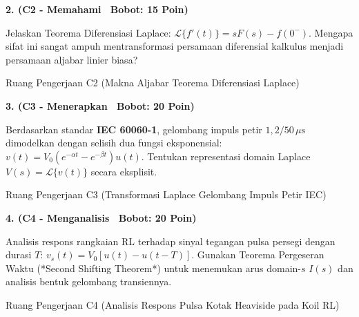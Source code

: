 \documentclass[10pt,a4paper]{article}
\begin{document}
\vspace{1mm}

\noindent\textbf{2. (C2 - Memahami \textbar\ Bobot: 15 Poin)}\par\vspace{0.5mm}
{\footnotesize Jelaskan Teorema Diferensiasi Laplace: $\mathcal{L}\{f'(t)\} = s F(s) - f(0^-)$. Mengapa sifat ini sangat ampuh mentransformasi persamaan diferensial kalkulus menjadi persamaan aljabar linier biasa?}
\begin{answerbox}{Ruang Pengerjaan C2 (Makna Aljabar Teorema Diferensiasi Laplace)}
  \vspace{2.1cm}
\end{answerbox}

\vspace{1mm}

\noindent\textbf{3. (C3 - Menerapkan \textbar\ Bobot: 20 Poin)}\par\vspace{0.5mm}
\noindent\begin{minipage}[t]{0.60\textwidth}%
  {\footnotesize Berdasarkan standar \textbf{IEC 60060-1}, gelombang impuls petir $1{,}2/50\,\mu\text{s}$ dimodelkan dengan selisih dua fungsi eksponensial: $v(t) = V_0 (e^{-\alpha t} - e^{-\beta t}) u(t)$. Tentukan representasi domain Laplace $V(s) = \mathcal{L}\{v(t)\}$ secara eksplisit.}%
\end{minipage}%
\hfill%
\begin{minipage}[t]{0.37\textwidth}%
  \centering
\end{minipage}\par\vspace{1mm}
\begin{answerbox}{Ruang Pengerjaan C3 (Transformasi Laplace Gelombang Impuls Petir IEC)}
  \vspace{2.8cm}
\end{answerbox}

\newpage

\noindent\textbf{4. (C4 - Menganalisis \textbar\ Bobot: 20 Poin)}\par\vspace{0.5mm}
{\footnotesize Analisis respons rangkaian RL terhadap sinyal tegangan pulsa persegi dengan durasi $T$: $v_s(t) = V_0 [u(t) - u(t-T)]$. Gunakan Teorema Pergeseran Waktu (*Second Shifting Theorem*) untuk menemukan arus domain-$s$ $I(s)$ dan analisis bentuk gelombang transiennya.}
\begin{answerbox}{Ruang Pengerjaan C4 (Analisis Respons Pulsa Kotak Heaviside pada Koil RL)}
  \vspace{3.8cm}
\end{answerbox}
\end{document}
